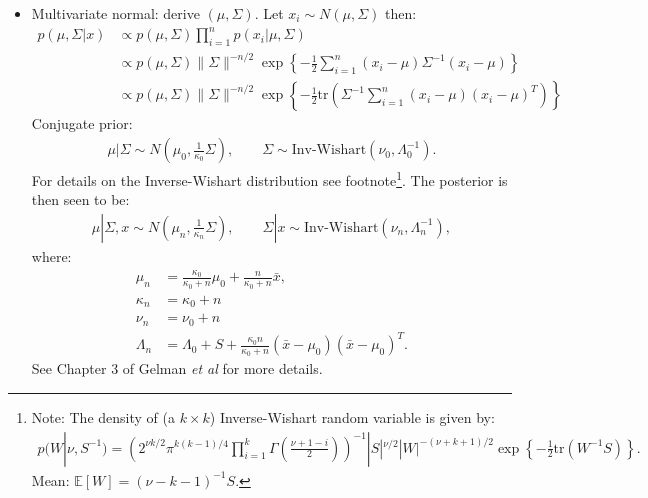\documentclass[11pt]{article}
\begin{document}
\begin{itemize}
\item Multivariate normal: derive $(\mu,\Sigma)$. Let $x_{i}\sim{}N(\mu,\Sigma)$ then:
\begin{align*}
 p(\mu,\Sigma|x) &\propto p(\mu,\Sigma)\prod_{i=1}^{n}p(x_{i}|\mu,\Sigma) \\
  &\propto p(\mu,\Sigma)\|\Sigma\|^{-n/2}\exp\left\{-\frac{1}{2}\sum_{i=1}^{n}(x_{i}-\mu)\Sigma^{-1}(x_{i}-\mu)\right\} \\
  &\propto p(\mu,\Sigma)\|\Sigma\|^{-n/2}\exp\left\{-\frac{1}{2}\textrm{tr}\left(\Sigma^{-1}\sum_{i=1}^{n}(x_{i}-\mu)(x_{i}-\mu)^{T}\right)\right\}
\end{align*}
Conjugate prior:
\begin{align*}
 \mu | \Sigma \sim N\left(\mu_{0},\frac{1}{\kappa_{0}}\Sigma\right) , \qquad \Sigma \sim \textrm{Inv-Wishart}(\nu_{0},\Lambda_{0}^{-1}) . 
\end{align*}
For details on the Inverse-Wishart distribution see footnote\footnote{Note: The density of (a $k\times{}k$) Inverse-Wishart random variable is given by:
\begin{align*}
 p(W|\nu,S^{-1}) = \left(2^{\nu{}k/2}\pi^{k(k-1)/4}\prod_{i=1}^{k}\Gamma(\frac{\nu+1-i}{2})\right)^{-1}|S|^{\nu/2}|W|^{-(\nu+k+1)/2}\exp\left\{-\frac{1}{2}\textrm{tr}\left(W^{-1}S\right)\right\} .
\end{align*}
Mean: $\mathbb{E}\left[W\right]=(\nu-k-1)^{-1}S$. 
}. The posterior is then seen to be:
\begin{align*}
 \mu | \Sigma, x \sim N\left(\mu_{n},\frac{1}{\kappa_{n}}\Sigma\right) , \qquad \Sigma | x \sim \textrm{Inv-Wishart}(\nu_{n},\Lambda_{n}^{-1}) , 
\end{align*}
where:
\begin{align*}
 \mu_{n} &= \frac{\kappa_{0}}{\kappa_{0}+n}\mu_{0} + \frac{n}{\kappa_{0}+n}\bar{x} , \\
 \kappa_{n} &= \kappa_{0} + n \\
 \nu_{n} &= \nu_{0} + n \\
 \Lambda_{n} &= \Lambda_{0} + S + \frac{\kappa_{0}n}{\kappa_{0}+n}(\bar{x}-\mu_{0})(\bar{x}-\mu_{0})^{T} .
\end{align*}
See Chapter 3 of Gelman \emph{et al} for more details.


\end{itemize}
\end{document}
